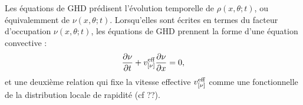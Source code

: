 Les équations de GHD \cite{bertini_transport_2016,castro-alvaredo_emergent_2016} prédisent l'évolution temporelle de $\rho(x,\theta ; t)$, ou équivalemment de $\nu(x,\theta ; t)$. Lorsqu'elles sont écrites en termes du facteur d'occupation $\nu(x,\theta ; t )$, les équations de GHD prennent la forme d'une équation convective :
\begin{equation}
\frac{\partial \nu}{\partial t} + v^{\rm{eff}}_{[\nu]} \frac{\partial \nu}{\partial x} = 0 ,
\end{equation}
et une deuxième relation qui fixe la vitesse effective $v^{\rm{eff}}_{[\nu]}$ comme une fonctionnelle de la distribution locale de rapidité (cf {??}).
